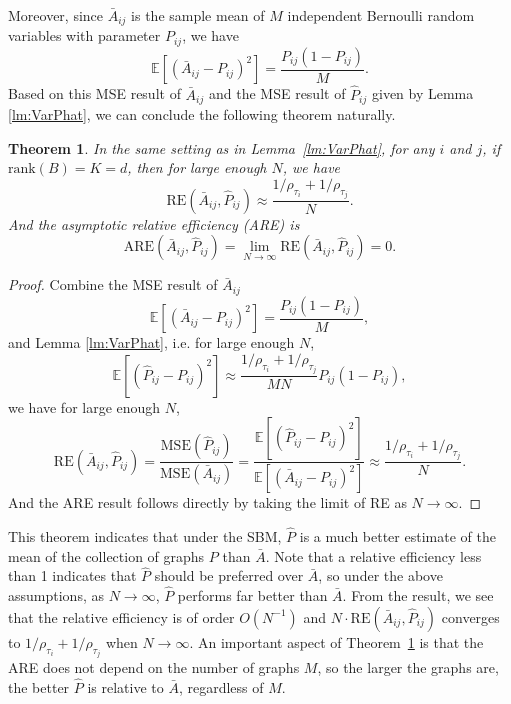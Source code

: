 \documentclass[10pt,letterpaper]{article}
\newtheorem{theorem}[fact]{Theorem}
\newcommand{\Ex}{\mathbb{E}}
\renewcommand{\hat}{\widehat}
\begin{document}
Moreover, since $\bar{A}_{ij}$ is the sample mean of $M$ independent Bernoulli random variables with parameter $P_{ij}$, we have
\[
    \Ex[(\bar{A}_{ij} - P_{ij})^2] = \frac{P_{ij}(1-P_{ij})}{M}.
\]
Based on this MSE result of $\bar{A}_{ij}$ and the MSE result of $\hat{P}_{ij}$ given by Lemma \ref{lm:VarPhat}, we can conclude the following theorem naturally.
\begin{theorem}
\label{thm:ARE}
In the same setting as in Lemma~\ref{lm:VarPhat}, for any $i$ and $j$, if $\mathrm{rank}(B)=K=d$, then for large enough $N$, we have
\begin{equation}
	    \mathrm{RE}(\bar{A}_{ij}, \hat{P}_{ij}) \approx
    \frac{1/\rho_{\tau_i} + 1/\rho_{\tau_j}}{N}.
\label{eq:approx_re}
\end{equation}
And the asymptotic relative efficiency (ARE) is 
\[
    \mathrm{ARE}(\bar{A}_{ij}, \hat{P}_{ij}) = \lim_{N \to \infty} \mathrm{RE}(\bar{A}_{ij}, \hat{P}_{ij}) = 0.
    \label{eq:sbm_are}
\]
\end{theorem}
\begin{proof}
Combine the MSE result of $\bar{A}_{ij}$
\[
    \Ex[(\bar{A}_{ij} - P_{ij})^2] = \frac{P_{ij}(1-P_{ij})}{M},
\]
and Lemma \ref{lm:VarPhat}, i.e. for large enough $N$,
\[
    \Ex[(\hat{P}_{ij} - P_{ij})^2] \approx
    \frac{1/\rho_{\tau_i} + 1/\rho_{\tau_j}}{M N} P_{ij}(1-P_{ij}),
\]
we have for large enough $N$,
\[
	    \mathrm{RE}(\bar{A}_{ij}, \hat{P}_{ij}) = \frac{\mathrm{MSE}(\hat{P}_{ij})}{\mathrm{MSE}(\bar{A}_{ij})}
	    = \frac{\Ex[(\hat{P}_{ij} - P_{ij})^2]}{\Ex[(\bar{A}_{ij} - P_{ij})^2]}
	    \approx \frac{1/\rho_{\tau_i} + 1/\rho_{\tau_j}}{N}.
\]
And the ARE result follows directly by taking the limit of RE as $N\to \infty$.
\end{proof}

This theorem indicates that under the SBM, $\hat{P}$ is a much better estimate of the mean of the collection of graphs $P$ than $\bar{A}$.
Note that a relative efficiency less than 1 indicates that $\hat{P}$ should be preferred over $\bar{A}$, so under the above assumptions, as $N\to\infty$, $\hat{P}$ performs far better than $\bar{A}$.
From the result, we see that the relative efficiency is of order $O(N^{-1})$ and $N \cdot \mathrm{RE}(\bar{A}_{ij}, \hat{P}_{ij})$ converges to $1/\rho_{\tau_i}+1/\rho_{\tau_j}$ when $N\to\infty$.
An important aspect of Theorem~\ref{thm:ARE} is that the ARE does not depend on the number of graphs $M$, so the larger the graphs are, the better $\hat{P}$ is relative to $\bar{A}$, regardless of $M$.
\end{document}
